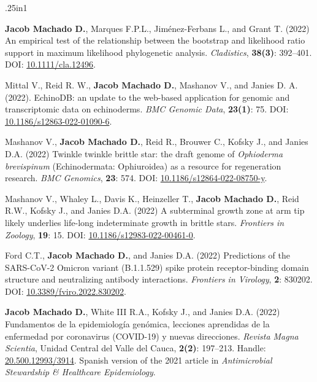 \documentclass[11pt, letterpaper, sans]{moderncv}
\begin{document}
	{\setlength{\parskip}{.5em}\renewcommand{\baselinestretch}{2.0}\begin{hangparas}{.25in}{1}

		\textbf{Jacob Machado D.}, Marques F.P.L., Jiménez-Ferbans L., and Grant T. (2022) An empirical test of the relationship between the bootstrap and likelihood ratio support in maximum likelihood phylogenetic analysis. \textit{Cladistics}, \textbf{38(3)}: 392--401. DOI: \href{https://doi.org/10.1111/cla.12496}{10.1111/cla.12496}.

		Mittal V., Reid R. W., \textbf{Jacob Machado D.}, Mashanov V., and Janies D. A. (2022). EchinoDB: an update to the web-based application for genomic and transcriptomic data on echinoderms. \textit{BMC Genomic Data}, \textbf{23(1)}: 75. DOI: \href{https://doi.org/10.1186/s12863-022-01090-6}{10.1186/s12863-022-01090-6}.

		Mashanov V., \textbf{Jacob Machado D.}, Reid R., Brouwer C., Kofsky J., and Janies D.A. (2022) Twinkle twinkle brittle star: the draft genome of \textit{Ophioderma brevispinum} (Echinodermata: Ophiuroidea) as a resource for regeneration research. \textit{BMC Genomics}, \textbf{23}: 574. DOI: \href{https://doi.org/10.1186/s12864-022-08750-y}{10.1186/s12864-022-08750-y}.

		Mashanov V., Whaley L., Davis K., Heinzeller T., \textbf{Jacob Machado D.}, Reid R.W., Kofsky J., and Janies D.A. (2022) A subterminal growth zone at arm tip likely underlies life-long indeterminate growth in brittle stars. \textit{Frontiers in Zoology}, \textbf{19}: 15. DOI: \href{https://doi.org/10.1186/s12983-022-00461-0}{10.1186/s12983-022-00461-0}.

		Ford C.T., \textbf{Jacob Machado D.}, and Janies D.A. (2022) Predictions of the SARS-CoV-2 Omicron variant (B.1.1.529) spike protein receptor-binding domain structure and neutralizing antibody interactions. \textit{Frontiers in Virology}, \textbf{2}: 830202. DOI: \href{https://doi.org/10.3389/fviro.2022.830202}{10.3389/fviro.2022.830202}.

		\textbf{Jacob Machado D.}, White III R.A., Kofsky J., and Janies D.A. (2022) Fundamentos de la epidemiología genómica, lecciones aprendidas de la enfermedad por coronavirus (COVID-19) y nuevas direcciones. \textit{Revista Magna Scientia}, Unidad Central del Valle del Cauca, \textbf{2(2)}: 197--213. Handle: \href{https://hdl.handle.net/20.500.12993/3914}{20.500.12993/3914}. Spanish version of the 2021 article in \textit{Antimicrobial Stewardship \& Healthcare Epidemiology}.

	\end{hangparas}}
\end{document}
